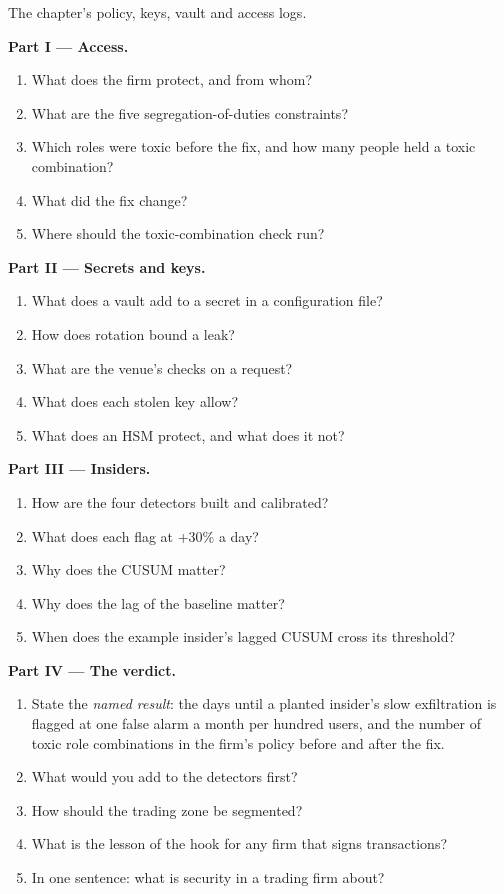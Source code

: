 \begin{problem}\label{pb:pl:security:1}
The chapter's policy, keys, vault and access logs.

\medskip\noindent\textbf{Part I --- Access.}
\begin{enumerate}
\item What does the firm protect, and from whom?
\item What are the five segregation-of-duties constraints?
\item Which roles were toxic before the fix, and how many people held a toxic combination?
\item What did the fix change?
\item Where should the toxic-combination check run?
\end{enumerate}

\medskip\noindent\textbf{Part II --- Secrets and keys.}
\begin{enumerate}[resume]
\item What does a vault add to a secret in a configuration file?
\item How does rotation bound a leak?
\item What are the venue's checks on a request?
\item What does each stolen key allow?
\item What does an HSM protect, and what does it not?
\end{enumerate}

\medskip\noindent\textbf{Part III --- Insiders.}
\begin{enumerate}[resume]
\item How are the four detectors built and calibrated?
\item What does each flag at +30\% a day?
\item Why does the CUSUM matter?
\item Why does the lag of the baseline matter?
\item When does the example insider's lagged CUSUM cross its threshold?
\end{enumerate}

\medskip\noindent\textbf{Part IV --- The verdict.}
\begin{enumerate}[resume]
\item State the \emph{named result}: the days until a planted insider's slow exfiltration is flagged at one false alarm a month per hundred
users, and the number of toxic role combinations in the firm's policy before and after the fix.
\item What would you add to the detectors first?
\item How should the trading zone be segmented?
\item What is the lesson of the hook for any firm that signs transactions?
\item In one sentence: what is security in a trading firm about?
\end{enumerate}
\end{problem}

